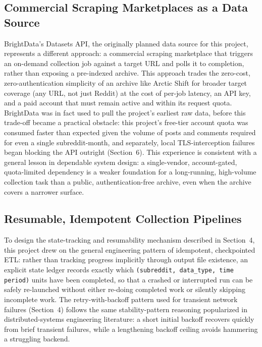 \documentclass[12pt]{article}
\begin{document}
\subsection{Commercial Scraping Marketplaces as a Data Source}
BrightData's Datasets API, the originally planned data source for this project, represents a
different approach: a commercial scraping marketplace that triggers an on-demand collection job
against a target URL and polls it to completion, rather than exposing a pre-indexed archive.
This approach trades the zero-cost, zero-authentication simplicity of an archive like Arctic
Shift for broader target coverage (any URL, not just Reddit) at the cost of per-job latency,
an API key, and a paid account that must remain active and within its request quota. BrightData
was in fact used to pull the project's earliest raw data, before this trade-off became a practical
obstacle: this project's free-tier account quota was consumed faster than expected given the
volume of posts and comments required for even a single subreddit-month, and separately, local
TLS-interception failures began blocking the API outright (Section~6). This experience is
consistent with a general lesson in dependable system design: a single-vendor, account-gated,
quota-limited dependency is a weaker foundation for a long-running, high-volume collection task
than a public, authentication-free archive, even when the archive covers a narrower surface.

\subsection{Resumable, Idempotent Collection Pipelines}
To design the state-tracking and resumability mechanism described in Section~4, this project
drew on the general engineering pattern of idempotent, checkpointed ETL: rather than tracking
progress implicitly through output file existence, an explicit state ledger records exactly which
\texttt{(subreddit, data\_type, time period)} units have been completed, so that a crashed or
interrupted run can be safely re-launched without either re-doing completed work or silently
skipping incomplete work. The retry-with-backoff pattern used for transient network failures
(Section~4) follows the same stability-pattern reasoning popularized in distributed-systems
engineering literature: a short initial backoff recovers quickly from brief transient failures,
while a lengthening backoff ceiling avoids hammering a struggling backend.


\end{document}
